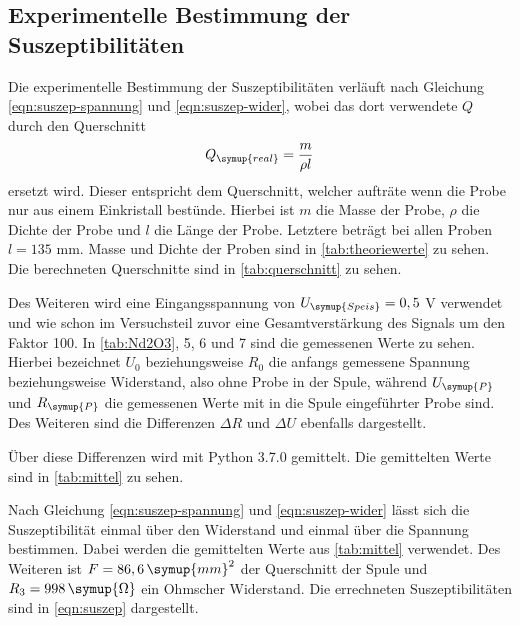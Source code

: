     \subsection{Experimentelle Bestimmung der Suszeptibilitäten}
    Die experimentelle Bestimmung der Suszeptibilitäten verläuft nach Gleichung \eqref{eqn:suszep-spannung} und \eqref{eqn:suszep-wider},
    wobei das dort verwendete $Q$ durch den Querschnitt
    \begin{equation}
    \label{eqn:qreal}
    Q_{\symup{real}} = \frac{m}{\rho l}
    \end{equation}
    ersetzt wird. Dieser entspricht dem Querschnitt, welcher aufträte wenn die Probe nur aus einem Einkristall bestünde.
    Hierbei ist $m$ die Masse der Probe, $\rho$ die Dichte der Probe und $l$ die Länge der Probe. Letztere beträgt bei allen 
    Proben $l = 135$ mm. Masse und Dichte der Proben sind in \autoref{tab:theoriewerte} zu sehen.
    Die berechneten Querschnitte sind in \autoref{tab:querschnitt} zu sehen.
    
    Des Weiteren wird eine Eingangsspannung von $U_{\symup{Speis}} = 0,5$ V verwendet und wie schon im Versuchsteil zuvor eine Gesamtverstärkung
    des Signals um den Faktor 100. In \autoref{tab:Nd2O3}, 5, 6 und 7 sind die gemessenen
    Werte zu sehen. Hierbei bezeichnet $U_0$ beziehungsweise $R_0$ die anfangs gemessene Spannung beziehungsweise Widerstand, also ohne
    Probe in der Spule, während $U_{\symup{P}}$ und $R_{\symup{P}}$ die gemessenen Werte mit in die Spule eingeführter Probe sind. Des
    Weiteren sind die Differenzen $\Delta R$ und $\Delta U$ ebenfalls dargestellt.
    
    
    
    
    Über diese Differenzen wird mit Python 3.7.0 gemittelt. Die gemittelten Werte sind in \autoref{tab:mittel} zu sehen.
    
    Nach Gleichung \eqref{eqn:suszep-spannung} und \eqref{eqn:suszep-wider} lässt sich die Suszeptibilität einmal über den Widerstand und 
    einmal über die Spannung bestimmen. Dabei werden die gemittelten Werte aus \autoref{tab:mittel} verwendet.
    Des Weiteren ist $F = 86,6 \, \symup{mm}^2$ der Querschnitt der Spule und $R_3 = 998 \, \symup{ \Omega}$ ein Ohmscher Widerstand.
    Die errechneten Suszeptibilitäten sind in \autoref{eqn:suszep} dargestellt.
    